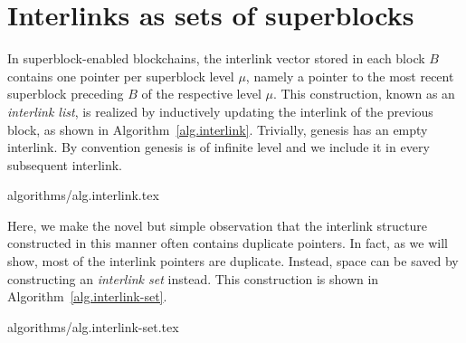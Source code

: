 \section{Interlinks as sets of superblocks}

In superblock-enabled blockchains, the interlink vector stored in each block $B$
contains one pointer per superblock level $\mu$, namely a pointer to the most
recent superblock preceding $B$ of the respective level $\mu$. This
construction, known as an \emph{interlink list}, is realized by inductively
updating the interlink of the previous block, as shown in
Algorithm~\ref{alg.interlink}. Trivially, genesis has an empty interlink. By
convention genesis is of infinite level and we include it in every subsequent
interlink.

{algorithms/alg.interlink.tex}

Here, we make the novel but simple observation that the interlink structure
constructed in this manner often contains duplicate pointers. In fact, as we
will show, most of the interlink pointers are duplicate. Instead, space can be
saved by constructing an \emph{interlink set} instead. This construction is
shown in Algorithm~\ref{alg.interlink-set}.

{algorithms/alg.interlink-set.tex}
